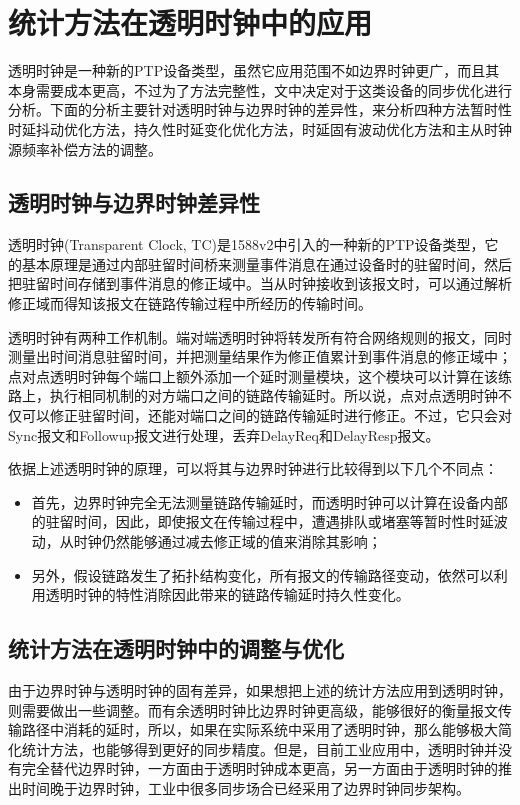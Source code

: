 \section{统计方法在透明时钟中的应用}
透明时钟是一种新的PTP设备类型，虽然它应用范围不如边界时钟更广，而且其本身需要成本更高，不过为了方法完整性，文中决定对于这类设备的同步优化进行分析。下面的分析主要针对透明时钟与边界时钟的差异性，来分析四种方法暂时性时延抖动优化方法，持久性时延变化优化方法，时延固有波动优化方法和主从时钟源频率补偿方法的调整。

\subsection{透明时钟与边界时钟差异性}
透明时钟(Transparent Clock, TC)是1588v2中引入的一种新的PTP设备类型，它的基本原理是通过内部驻留时间桥来测量事件消息在通过设备时的驻留时间，然后把驻留时间存储到事件消息的修正域中。当从时钟接收到该报文时，可以通过解析修正域而得知该报文在链路传输过程中所经历的传输时间。

透明时钟有两种工作机制。端对端透明时钟将转发所有符合网络规则的报文，同时测量出时间消息驻留时间，并把测量结果作为修正值累计到事件消息的修正域中；点对点透明时钟每个端口上额外添加一个延时测量模块，这个模块可以计算在该练路上，执行相同机制的对方端口之间的链路传输延时。所以说，点对点透明时钟不仅可以修正驻留时间，还能对端口之间的链路传输延时进行修正。不过，它只会对Sync报文和Followup报文进行处理，丢弃DelayReq和DelayResp报文。

依据上述透明时钟的原理，可以将其与边界时钟进行比较得到以下几个不同点：
\begin{itemize}[noitemsep,topsep=0pt,parsep=0pt,partopsep=0pt]
  \item 首先，边界时钟完全无法测量链路传输延时，而透明时钟可以计算在设备内部的驻留时间，因此，即使报文在传输过程中，遭遇排队或堵塞等暂时性时延波动，从时钟仍然能够通过减去修正域的值来消除其影响；
  \item 另外，假设链路发生了拓扑结构变化，所有报文的传输路径变动，依然可以利用透明时钟的特性消除因此带来的链路传输延时持久性变化。
\end{itemize}

\subsection{统计方法在透明时钟中的调整与优化}
由于边界时钟与透明时钟的固有差异，如果想把上述的统计方法应用到透明时钟，则需要做出一些调整。而有余透明时钟比边界时钟更高级，能够很好的衡量报文传输路径中消耗的延时，所以，如果在实际系统中采用了透明时钟，那么能够极大简化统计方法，也能够得到更好的同步精度。但是，目前工业应用中，透明时钟并没有完全替代边界时钟，一方面由于透明时钟成本更高，另一方面由于透明时钟的推出时间晚于边界时钟，工业中很多同步场合已经采用了边界时钟同步架构。

